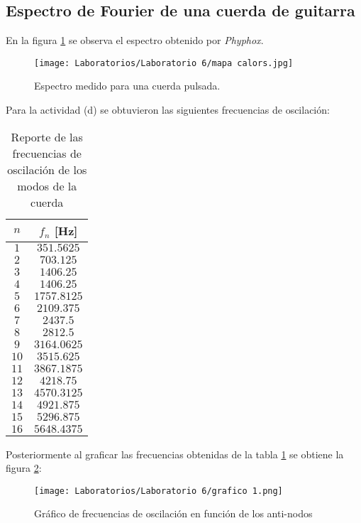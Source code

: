 \documentclass[letterpaper,11pt]{article} %
\begin{document}
\subsection{Espectro de Fourier de una cuerda de guitarra}
En la figura \ref{mapa de calor culiao} se observa el espectro obtenido por \textit{Phyphox}.
\begin{figure}
    \centering
    \texttt{[image: Laboratorios/Laboratorio 6/mapa calors.jpg]}
    \caption{Espectro medido para una cuerda pulsada.}
    \label{mapa de calor culiao}
\end{figure}
Para la actividad (d) se obtuvieron las siguientes frecuencias de oscilación:
\begin{table}[H]
    \centering
    \begin{tabular}{|c|c|} \hline
         $n$ & $f_n$ [Hz]  \\ \hline
         $1$ & $351.5625$ \\ \hline
         $2$ & $703.125$ \\ \hline
         $3$ & $1406.25$  \\ \hline
         $4$ & $1406.25$ \\ \hline
         $5$ & $1757.8125$ \\ \hline
         $6$ & $2109.375$ \\ \hline
         $7$ & $2437.5$ \\ \hline
         $8$ & $2812.5$ \\ \hline
         $9$ & $3164.0625$ \\ \hline
         $10$ & $3515.625$ \\ \hline
         $11$ & $3867.1875$ \\ \hline
         $12$ & $4218.75$ \\ \hline
         $13$ & $4570.3125$ \\ \hline
         $14$ & $4921.875$ \\ \hline
         $15$ & $5296.875$ \\ \hline
         $16$ & $5648.4375$ \\ \hline
    \end{tabular}
    \caption{Reporte de las frecuencias de oscilación de los modos de la cuerda}
    \label{tab:(d)}
\end{table}

Posteriormente al graficar las frecuencias obtenidas de la tabla \ref{tab:(d)} se obtiene la figura \ref{fig:(e)}:
\begin{figure}
    \centering
    \texttt{[image: Laboratorios/Laboratorio 6/grafico 1.png]}
    \caption{Gráfico de frecuencias de oscilación en función de los anti-nodos}
    \label{fig:(e)}
\end{figure}
\end{document}
